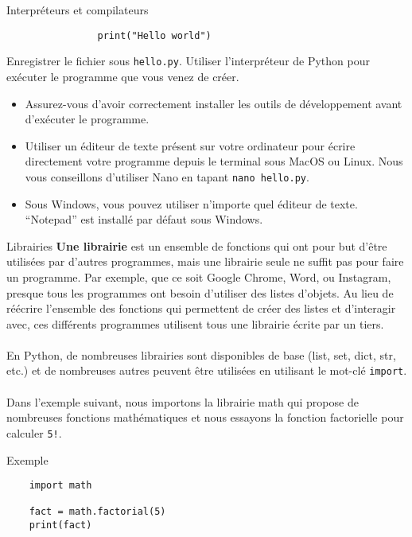 \begin{section}{Interpréteurs et compilateurs}
\begin{Exercice}[10 minutes]
\begin{lstlisting}
                print("Hello world")\end{lstlisting}
        Enregistrer le fichier sous \lstinline{hello.py}. Utiliser l'interpréteur de Python pour exécuter le programme que vous venez de créer.
    \end{Exercice}
    \begin{conseil}
        \begin{itemize}
            \item Assurez-vous d'avoir correctement installer les outils de développement avant d'exécuter le programme.
            \item Utiliser un éditeur de texte présent sur votre ordinateur pour écrire directement votre programme depuis le terminal sous MacOS ou Linux. Nous vous conseillons d'utiliser Nano en tapant \lstinline{nano hello.py}.
            \item Sous Windows, vous pouvez utiliser n'importe quel éditeur de texte. ``Notepad'' est installé par défaut sous Windows.
        \end{itemize}
    \end{conseil}    

\end{section}

\begin{section}{Librairies}
    \textbf{Une librairie} est un ensemble de fonctions qui ont pour but d'être utilisées par d'autres programmes, mais une librairie seule ne suffit pas pour faire un programme. Par exemple, que ce soit Google Chrome, Word, ou Instagram, presque tous les programmes ont besoin d'utiliser des listes d'objets. Au lieu de réécrire l'ensemble des fonctions qui permettent de créer des listes et d'interagir avec, ces différents programmes utilisent tous une librairie écrite par un tiers.
\\\\
En Python, de nombreuses librairies sont disponibles de base (list, set, dict, str, etc.) et de nombreuses autres peuvent être utilisées en utilisant le mot-clé \lstinline{import}.
\\\\
Dans l'exemple suivant, nous importons la librairie math qui propose de nombreuses fonctions mathématiques et nous essayons la fonction factorielle pour calculer \lstinline{5!}.
\begin{Example}{\faTerminal Exemple}
    \begin{lstlisting}
    import math

    fact = math.factorial(5)
    print(fact)\end{lstlisting}
\end{Example}
    
\end{section}




